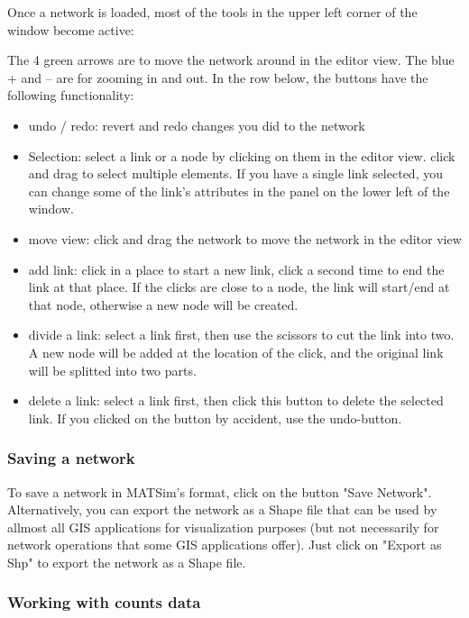 \documentclass[a4paper,11pt]{report}
\begin{document}
Once a network is loaded, most of the tools in the upper left corner of the window become active:



The 4 green arrows are to move the network around in the editor view.  The blue + and – are for zooming in and out. In the row below, the  buttons have the following functionality:
\begin{itemize}
	\item undo / redo: revert and redo changes you did to the network
	\item Selection: select a link or a node by clicking on them in the editor  view. click and drag to select multiple elements. If you have a single  link selected, you can change some of the link's attributes in the panel  on the lower left of the window.
	\item move view: click and drag the network to move the network in the editor view
	\item add link: click in a place to start a new link, click a second time  to end the link at that place. If the clicks are close to a node, the  link will start/end at that node, otherwise a new node will be created.
	\item divide a link: select a link first, then use the scissors to cut the  link into two. A new node will be added at the location of the click,  and the original link will be splitted into two parts.
	\item delete a link: select a link first, then click this button to delete  the selected link. If you clicked on the button by accident, use the  undo-button.
\end{itemize}

\subsubsection{Saving a network}

To save a network in MATSim's format, click on the button "Save  Network". Alternatively, you can export the network as a Shape file that  can be used by allmost all GIS applications for visualization purposes  (but not necessarily for network operations that some GIS applications  offer). Just click on "Export as Shp" to export the network as a Shape  file.

\subsubsection{Working with counts data}
\end{document}

